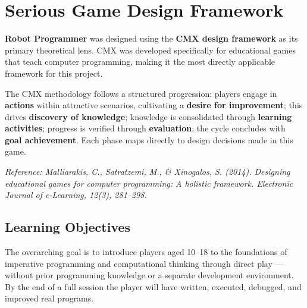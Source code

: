 \documentclass[12pt,a4paper]{article}
\begin{document}

\section{Serious Game Design Framework}

\begin{tcolorbox}[redbox, title={Framework Selection — CMX (Malliarakis, Satratzemi \& Xinogalos, 2014)}]
\textbf{Robot Programmer} was designed using the \textbf{CMX design framework} as its primary theoretical lens. CMX was developed specifically for educational games that teach computer programming, making it the most directly applicable framework for this project.

\vspace{4pt}
The CMX methodology follows a structured progression: players engage in \textbf{actions} within attractive scenarios, cultivating a \textbf{desire for improvement}; this drives \textbf{discovery of knowledge}; knowledge is consolidated through \textbf{learning activities}; progress is verified through \textbf{evaluation}; the cycle concludes with \textbf{goal achievement}. Each phase maps directly to design decisions made in this game.

\vspace{4pt}
\small\textit{Reference: Malliarakis, C., Satratzemi, M., \& Xinogalos, S. (2014). Designing educational games for computer programming: A holistic framework. \textit{Electronic Journal of e-Learning}, 12(3), 281--298.}
\end{tcolorbox}

\vspace{6pt}

\subsection{Learning Objectives}

\begin{tcolorbox}[gddbox, title={Generic Goals}]
The overarching goal is to introduce players aged 10--18 to the foundations of imperative programming and computational thinking through direct play --- without prior programming knowledge or a separate development environment. By the end of a full session the player will have written, executed, debugged, and improved real programs.
\end{tcolorbox}
\end{document}
